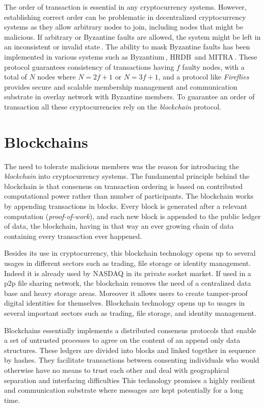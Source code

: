 \documentclass[USenglish]{uit-thesis}
\begin{document}
The order of transaction is essential in any cryptocurrency systems. 
However, establishing correct order can be problematic in
decentralized cryptocurrency systems as they allow 
arbitrary nodes to join, including nodes that might be malicious.
If arbitrary or Byzantine faults are allowed, the system might be left in an inconsistent or invalid state\,\cite{Lamport1982}.
The ability to mask Byzantine faults has been implemented in various systems such as
Byzantium\,\cite{Garcia:2011:EMB}, HRDB\,\cite{vandiver2007hrdb} and MITRA\,\cite{Luiz:2014:MBF}.
These protocol guarantees consistency of transactions having
$f$ faulty nodes, with a total of $N$ nodes where $N=2f+1$ or $N=3f+1$, and
a protocol like \emph{Fireflies}\,\cite{Johansen2015Fireflies} provides secure and
scalable membership management and communication substrate in overlay
network with Byzantine members. To guarantee an order of
transaction all these cryptocurrencies rely on the \emph{blockchain} protocol.

\section{Blockchains}
\label{sec:blockchains}
The need to tolerate malicious members was the reason for introducing
the \emph{blockchain} into cryptocurrency systems. The fundamental principle 
behind the blockchain is that consensus on transaction ordering is based on 
contributed computational power rather than number of participants. 
The blockchain works by appending
transactions in blocks. Every block is generated after a relevant computation
(\emph{proof-of-work}),
and each new block is appended to the public ledger of data,
the blockchain, having in that way an ever growing chain of data
containing every transaction ever happened.

Besides its use in cryptocurrency, this blockchain technology
opens up to several usages in different sectors such as
trading, file storage or identity management. Indeed it is already
used by NASDAQ in its private socket market.  If used in a \gls{p2p}
file sharing network, the blockchain removes the need of a centralized
data base and heavy storage areas. Moreover it allows users to create
tamper-proof digital identities for themselves.
Blockchain technology opens up to usages in several important sectors
such as trading, file storage, and identity management.

Blockchains essentially implements a distributed
consensus protocols that enable a set of untrusted
processes to agree on the content of an append only data structures. 
These ledgers are divided into blocks and linked together in sequence by hashes. 
They facilitate transactions between consenting individuals
who would otherwise have no means to trust each other and
deal with geographical separation and interfacing difficulties 
This technology promises a highly resilient and
communication substrate where messages are kept potentially for a long time.
\end{document}
